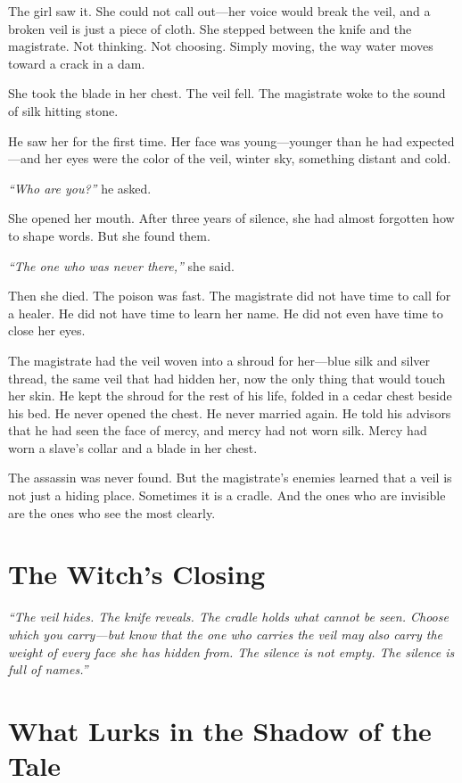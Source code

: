 The girl saw it. She could not call out—her voice would break the veil, and a broken veil is just a piece of cloth. She stepped between the knife and the magistrate. Not thinking. Not choosing. Simply moving, the way water moves toward a crack in a dam.

She took the blade in her chest. The veil fell. The magistrate woke to the sound of silk hitting stone.

He saw her for the first time. Her face was young—younger than he had expected—and her eyes were the color of the veil, winter sky, something distant and cold.

\textit{``Who are you?''} he asked.

She opened her mouth. After three years of silence, she had almost forgotten how to shape words. But she found them.

\textit{``The one who was never there,''} she said.

Then she died. The poison was fast. The magistrate did not have time to call for a healer. He did not have time to learn her name. He did not even have time to close her eyes.

The magistrate had the veil woven into a shroud for her—blue silk and silver thread, the same veil that had hidden her, now the only thing that would touch her skin. He kept the shroud for the rest of his life, folded in a cedar chest beside his bed. He never opened the chest. He never married again. He told his advisors that he had seen the face of mercy, and mercy had not worn silk. Mercy had worn a slave's collar and a blade in her chest.

The assassin was never found. But the magistrate's enemies learned that a veil is not just a hiding place. Sometimes it is a cradle. And the ones who are invisible are the ones who see the most clearly.

\section*{The Witch's Closing}
\textit{``The veil hides. The knife reveals. The cradle holds what cannot be seen. Choose which you carry—but know that the one who carries the veil may also carry the weight of every face she has hidden from. The silence is not empty. The silence is full of names.''}

\section*{What Lurks in the Shadow of the Tale}

